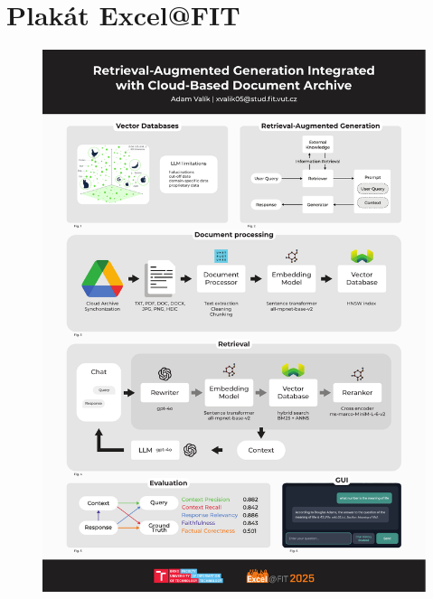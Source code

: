
%

\chapter{Plakát Excel@FIT}
\label{excel}
\begin{figure}[H]
    \centering
    \includegraphics[width=0.75\linewidth]{obrazky/excel@fit_a4_2.pdf}
    \label{fig:excelposter}
\end{figure}


%
